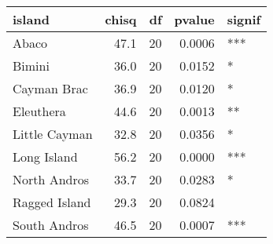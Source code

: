 
\begin{tabular}{lrrrl}
\toprule
island & chisq & df & pvalue & signif\\
\midrule
Abaco & 47.1 & 20 & 0.0006 & ***\\
Bimini & 36.0 & 20 & 0.0152 & *\\
Cayman Brac & 36.9 & 20 & 0.0120 & *\\
Eleuthera & 44.6 & 20 & 0.0013 & **\\
Little Cayman & 32.8 & 20 & 0.0356 & *\\
\addlinespace
Long Island & 56.2 & 20 & 0.0000 & ***\\
North Andros & 33.7 & 20 & 0.0283 & *\\
Ragged Island & 29.3 & 20 & 0.0824 & \\
South Andros & 46.5 & 20 & 0.0007 & ***\\
\bottomrule
\end{tabular}
